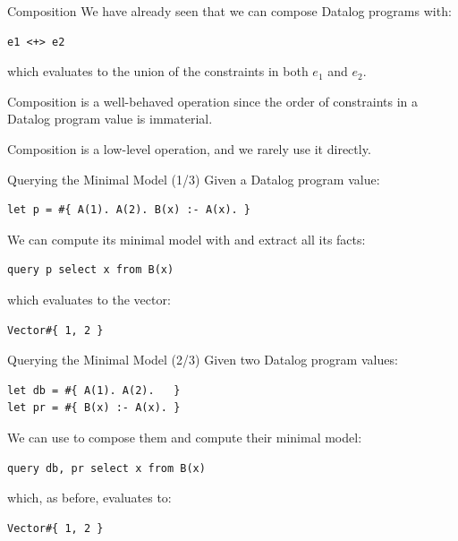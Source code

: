 \begin{frame}[fragile]{Composition}
We have already seen that we can compose Datalog programs with:

\begin{lstlisting}[language=flix, xleftmargin=0.8cm]
e1 <+> e2
\end{lstlisting}

which evaluates to the union of the constraints in both $e_1$ and $e_2$.

Composition is a well-behaved operation since the order of constraints in a
Datalog program value is immaterial. 

Composition is a low-level operation, and we rarely use it directly.
\end{frame}

\begin{frame}[fragile]{Querying the Minimal Model (1/3)}
Given a Datalog program value:

\begin{lstlisting}[language=flix, xleftmargin=0.8cm]
let p = #{ A(1). A(2). B(x) :- A(x). }
\end{lstlisting}

We can compute its minimal model with  and extract all its 
facts:

\begin{lstlisting}[language=flix, xleftmargin=0.8cm]
query p select x from B(x) 
\end{lstlisting}

which evaluates to the vector:

\begin{lstlisting}[language=flix, xleftmargin=0.8cm]
Vector#{ 1, 2 }
\end{lstlisting}
\end{frame}

\begin{frame}[fragile]{Querying the Minimal Model (2/3)}
Given two Datalog program values:
    
\begin{lstlisting}[language=flix, xleftmargin=0.8cm]
let db = #{ A(1). A(2).   }
let pr = #{ B(x) :- A(x). }
\end{lstlisting}

We can use  to compose them and compute their minimal model:

\begin{lstlisting}[language=flix, xleftmargin=0.8cm]
query db, pr select x from B(x) 
\end{lstlisting}

which, as before, evaluates to:

\begin{lstlisting}[language=flix, xleftmargin=0.8cm]
Vector#{ 1, 2 }
\end{lstlisting}
\end{frame}

